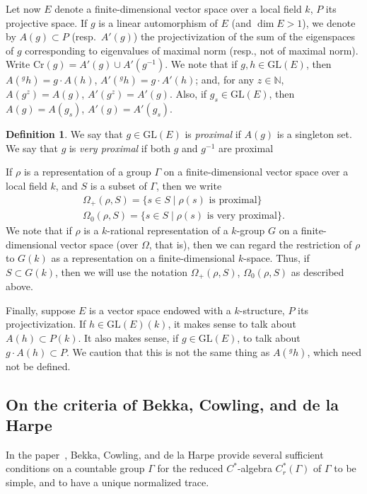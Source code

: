 \documentclass{amsart}
\theoremstyle{plain}
\theoremstyle{definition}
\newtheorem{definition}[theorem]{Definition}
\theoremstyle{remark}
\begin{document}
Let now $E$ denote a finite-dimensional vector space over a local field $k$, $P$ its
projective space.
If $g$ is a linear automorphism of $E$ (and $\dim E > 1$),
we denote by $A(g) \subset P$ (resp.\  $A'(g)$) the projectivization of the sum of the
eigenspaces of $g$ corresponding to eigenvalues of maximal norm (resp., not of maximal
norm). Write $\mathrm{Cr}(g) = A'(g)\cup A'(g^{-1})$. We note that if $g, h \in \mathrm{GL}(E)$,
then $A(\mbox{}^{g}h) = g
\cdot A(h)$, $A'(\mbox{}^{g}h) = g \cdot A'(h)$; and, for any $z \in \mathbb{N}$,
$A(g^{z}) = A(g)$, $A'(g^{z}) = A'(g)$. Also, if $g_{s} \in \mathrm{GL}(E)$, then
$A(g) = A(g_{s})$, $A'(g) = A'(g_{s})$.
\begin{definition}
We say that $g \in \mathrm{GL}(E)$ is \emph{proximal} if $A(g)$ is a singleton set. We say
that $g$ is \emph{very proximal} if both $g$ and $g^{-1}$ are proximal
\end{definition}
\noindent If $\rho$ is a representation of a group $\Gamma$ on a finite-dimensional
vector space over a local field $k$, and $S$ is a subset of $\Gamma$, then we write
\begin{gather*}
\Omega_{+}(\rho, S) = \{s \in S\mid\rho(s)\text{ is proximal}\}\\
\Omega_{0}(\rho, S) = \{s \in S\mid\rho(s)\text{ is very proximal}\}.
\end{gather*}
We note that if $\rho$ is a $k$-rational representation
of a $k$-group $G$ on a finite-dimensional
vector space (over $\Omega$, that is), then we can regard the restriction of $\rho$
to $G(k)$ as a representation on a finite-dimensional $k$-space. Thus, if $S\subset
G(k)$, then we will use the notation $\Omega_{+}(\rho, S)$, $\Omega_{0}(\rho, S)$
as described above. 

Finally, suppose $E$ is a vector space endowed with a $k$-structure, $P$ its
projectivization. If $h\in
\mathrm{GL}(E)(k)$, it makes sense to talk about $A(h) \subset P(k)$.
It also makes sense, if $g \in \mathrm{GL}(E)$, to talk about $g \cdot A(h) \subset P$.
We caution that this is not the same thing as $A(\mbox{}^{g}h)$, which need not be defined.

\subsection{On the criteria of Bekka, Cowling, and de la Harpe}\label{sec:BCD}
In the paper~\cite{MR96a:22020}, Bekka, Cowling, and de la Harpe provide several
sufficient conditions on a countable
group $\Gamma$ for the reduced $C^{*}$-algebra $C_{r}^{*}(\Gamma)$ of $\Gamma$ to be
simple, and to have a unique normalized trace.
\end{document}
